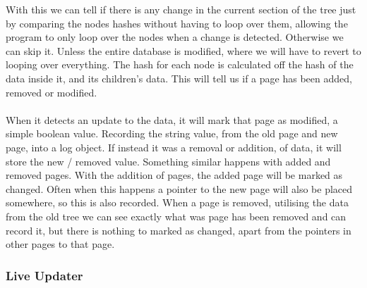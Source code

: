 With this we can tell if there is any change in the current section of the tree just by comparing the nodes hashes without having to loop over them, allowing the program to only loop over the nodes when a change is detected. Otherwise we can skip it. Unless the entire database is modified, where we will have to revert to looping over everything. The hash for each node is calculated off the hash of the data inside it, and its children’s data. This will tell us if a page has been added, removed or modified. 
\\\\
When it detects an update to the data, it will mark that page as modified, a simple boolean value. Recording the string value, from the old page and new page, into a log object. If instead it was a removal or addition, of data, it will store the new / removed value. Something similar happens with added and removed pages. With the addition of pages, the added page will be marked as changed. Often when this happens a pointer to the new page will also be placed somewhere, so this is also recorded. When a  page is removed, utilising the data from the old tree we can see exactly what was page has been removed and can record it, but there is nothing to marked as changed, apart from the pointers in other pages to that page. 

\subsubsection{Live Updater}
\label{subsubsec:live_Updater_imp}

